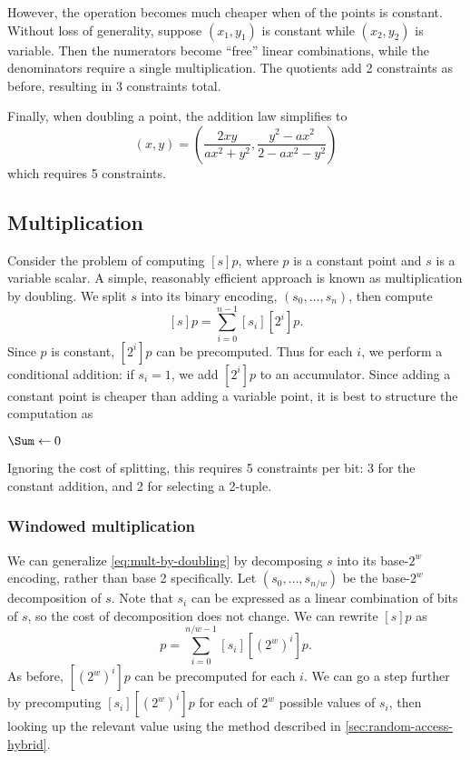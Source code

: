 \documentclass{article}
\begin{document}
However, the operation becomes much cheaper when of the points is constant. Without loss of generality, suppose $(x_1, y_1)$ is constant while $(x_2, y_2)$ is variable. Then the numerators become ``free'' linear combinations, while the denominators require a single multiplication. The quotients add 2 constraints as before, resulting in 3 constraints total.

Finally, when doubling a point, the addition law simplifies to
\begin{equation}
  [2] (x, y) = \left( \frac{2 x y}{a x^2 + y^2}, \frac{y^2 - a x^2}{2 - a x^2 - y^2} \right)
\end{equation}
which requires 5 constraints.


\subsection{Multiplication}

Consider the problem of computing $[s] p$, where $p$ is a constant point and $s$ is a variable scalar. A simple, reasonably efficient approach is known as multiplication by doubling. We split $s$ into its binary encoding, $(s_0, \dots, s_n)$, then compute
\begin{equation} \label{eq:mult-by-doubling}
  [s] p = \sum_{i=0}^{n-1} [s_i] [2^i] p.
\end{equation}
Since $p$ is constant, $[2^i] p$ can be precomputed. Thus for each $i$, we perform a conditional addition: if $s_i = 1$, we add $[2^i] p$ to an accumulator. Since adding a constant point is cheaper than adding a variable point, it is best to structure the computation as
\begin{center}
\begin{algorithm}[H]
  $\Sum \leftarrow 0$\;
  \Return \Sum\;
\end{algorithm}
\end{center}
Ignoring the cost of splitting, this requires 5 constraints per bit: 3 for the constant addition, and 2 for selecting a 2-tuple.


\subsubsection{Windowed multiplication}

We can generalize \autoref{eq:mult-by-doubling} by decomposing $s$ into its base-$2^w$ encoding, rather than base 2 specifically. Let $(s_0, \dots, s_{n/w})$ be the base-$2^w$ decomposition of $s$. Note that $s_i$ can be expressed as a linear combination of bits of $s$, so the cost of decomposition does not change. We can rewrite $[s] p$ as
\begin{equation}
  [s] p = \sum_{i=0}^{n/w-1} [s_i] [(2^w)^i] p.
\end{equation}
As before, $[(2^w)^i] p$ can be precomputed for each $i$. We can go a step further by precomputing $[s_i] [(2^w)^i] p$ for each of $2^w$ possible values of $s_i$, then looking up the relevant value using the method described in \autoref{sec:random-access-hybrid}.
\end{document}
